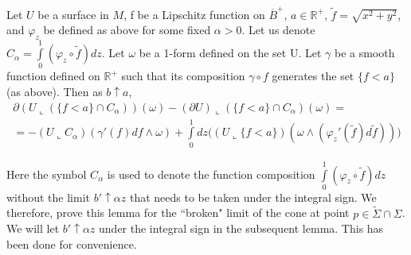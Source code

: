 \documentclass[10pt,a4paper]{amsart}
\newcommand{\ts}{\tilde{\Sigma}}
\begin{document}
\begin{lemma} \label{lemma: slice algebra}
    Let $U$ be a surface in $M$, f be a Lipschitz function on $\overline{B}^{+}$, $a \in \mathbb{R}^{+}$, $\tilde{f} = \sqrt{x^2 + y^2}$, and $\varphi_z$ be defined as above for some fixed $\alpha > 0$. Let us denote $C_{\alpha} = \int\limits_{0}^{1} (\varphi_z \circ \tilde{f}) dz$. Let $\omega$ be a 1-form defined on the set U. Let $\gamma$ be a smooth function defined on $\mathbb{R}^{+}$ such that its composition $\gamma \circ f$ generates the set $\{f < a\}$ (as above). Then as $b \uparrow a$,
    \begin{align*}
        \partial (U \llcorner (\{f < a\} \cap C_{\alpha})) (\omega) - (\partial U) \llcorner (\{f < a\} \cap C_{\alpha})(\omega) = \\ 
        = - (U \llcorner C_{\alpha})(\gamma'(f)df \wedge \omega) + \int\limits_{0}^{1} dz \Big( (U \llcorner \{ f < a \})(\omega \wedge (\varphi_{z}'(\tilde{f})d\tilde{f})) \Big)
    \end{align*}
    
\begin{remark} \nonumber
    Here the symbol $C_{\alpha}$ is used to denote the function composition $\int\limits_{0}^{1} (\varphi_z \circ \tilde{f}) dz$ without the limit $b' \uparrow \alpha z$ that needs to be taken under the integral sign. We therefore, prove this lemma for the ``broken" limit of the cone at point $p \in \ts \cap \Sigma$. We will let $b' \uparrow \alpha z$ under the integral sign in the subsequent lemma. This has been done for convenience.
\end{remark}
    
\end{lemma}
\end{document}
